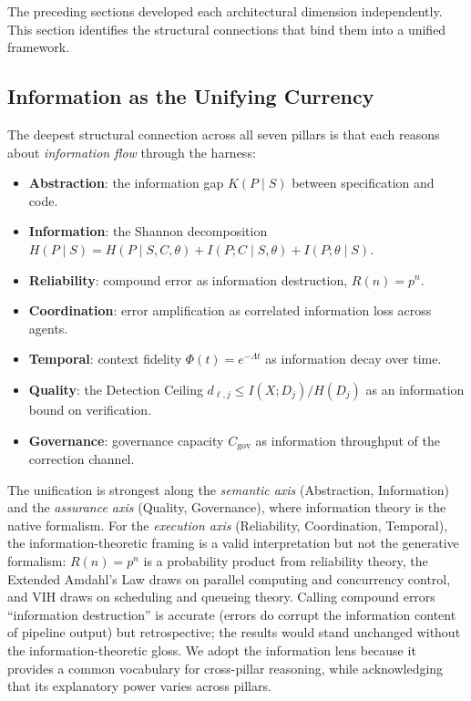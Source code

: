 \documentclass[11pt, a4paper, logo, copyright]{googledeepmind}
\begin{document}
The preceding sections developed each architectural dimension independently. This section identifies the structural connections that bind them into a unified framework.

\subsection{Information as the Unifying Currency}

The deepest structural connection across all seven pillars is that each reasons about \emph{information flow} through the harness:

\begin{itemize}[nosep]
    \item \textbf{Abstraction}: the information gap $K(P \mid S)$ between specification and code.
    \item \textbf{Information}: the Shannon decomposition $H(P \mid S) = H(P \mid S,C,\theta) + I(P;C \mid S,\theta) + I(P;\theta \mid S)$.
    \item \textbf{Reliability}: compound error as information destruction, $R(n) = p^n$.
    \item \textbf{Coordination}: error amplification as correlated information loss across agents.
    \item \textbf{Temporal}: context fidelity $\Phi(t) = e^{-\Lambda t}$ as information decay over time.
    \item \textbf{Quality}: the Detection Ceiling $d_{\ell,j} \leq I(X; D_j)/H(D_j)$ as an information bound on verification.
    \item \textbf{Governance}: governance capacity $C_{\text{gov}}$ as information throughput of the correction channel.
\end{itemize}

The unification is strongest along the \emph{semantic axis} (Abstraction, Information) and the \emph{assurance axis} (Quality, Governance), where information theory is the native formalism. For the \emph{execution axis} (Reliability, Coordination, Temporal), the information-theoretic framing is a valid interpretation but not the generative formalism: $R(n) = p^n$ is a probability product from reliability theory, the Extended Amdahl's Law draws on parallel computing and concurrency control, and VIH draws on scheduling and queueing theory. Calling compound errors ``information destruction'' is accurate (errors do corrupt the information content of pipeline output) but retrospective; the results would stand unchanged without the information-theoretic gloss. We adopt the information lens because it provides a common vocabulary for cross-pillar reasoning, while acknowledging that its explanatory power varies across pillars.
\end{document}
